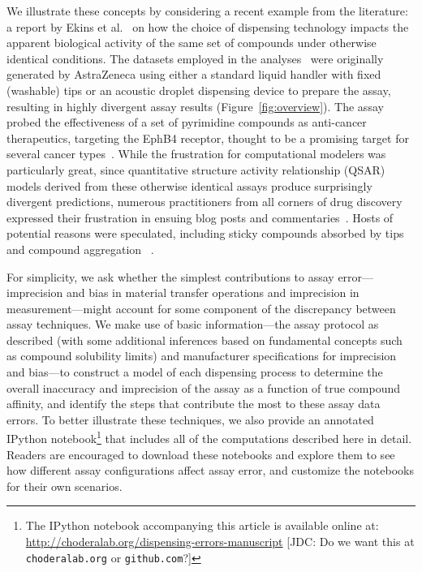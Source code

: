 \documentclass[aps,pre,twocolumn,nofootinbib,superscriptaddress,linenumbers]{revtex4-1}
\begin{document}
We illustrate these concepts by considering a recent example from the literature: a report by Ekins et al.~\cite{ekins_dispensing_2013} on how the choice of dispensing technology impacts the apparent biological activity of the same set of compounds under otherwise identical conditions.
The datasets employed in the analyses~\cite{barlaam_novel_2009,barlaam_pyrimidine_2010} were originally generated by AstraZeneca using either a standard liquid handler with fixed (washable) tips or an acoustic droplet dispensing device to prepare the assay, resulting in highly divergent assay results (Figure~\ref{fig:overview}).
The assay probed the effectiveness of a set of pyrimidine compounds as anti-cancer therapeutics, targeting the EphB4 receptor, thought to be a promising target for several cancer types~\cite{xia_ephb4_2005,bardelle_inhibitors_2008}.
While the frustration for computational modelers was particularly great, since quantitative structure activity relationship (QSAR) models derived from these otherwise identical assays produce surprisingly divergent predictions, numerous practitioners from all corners of drug discovery expressed their frustration in ensuing blog posts and commentaries~\cite{lowe_drug_2015,evanko_serial_2013,ekins_what_2013}.
Hosts of potential reasons were speculated, including sticky compounds absorbed by tips ~\cite{palmgren_drug_2006} and compound aggregation ~\cite{feng_synergy_2006,feng_high-throughput_2005}.

For simplicity, we ask whether the simplest contributions to assay error---imprecision and bias in material transfer operations and imprecision in measurement---might account for some component of the discrepancy between assay techniques.
We make use of basic information---the assay protocol as described (with some additional inferences based on fundamental concepts such as compound solubility limits) and manufacturer specifications for imprecision and bias---to construct a model of each dispensing process to determine the overall inaccuracy and imprecision of the assay as a function of true compound affinity, and identify the steps that contribute the most to these assay data errors.
To better illustrate these techniques, we also provide an annotated IPython notebook\footnote{The IPython notebook accompanying this article is available online at: \url{http://choderalab.org/dispensing-errors-manuscript} {\color{red}[JDC: Do we want this at {\tt choderalab.org} or {\tt github.com}?]}} that includes all of the computations described here in detail.
Readers are encouraged to download these notebooks and explore them to see how different assay configurations affect assay error, and customize the notebooks for their own scenarios.
\end{document}
